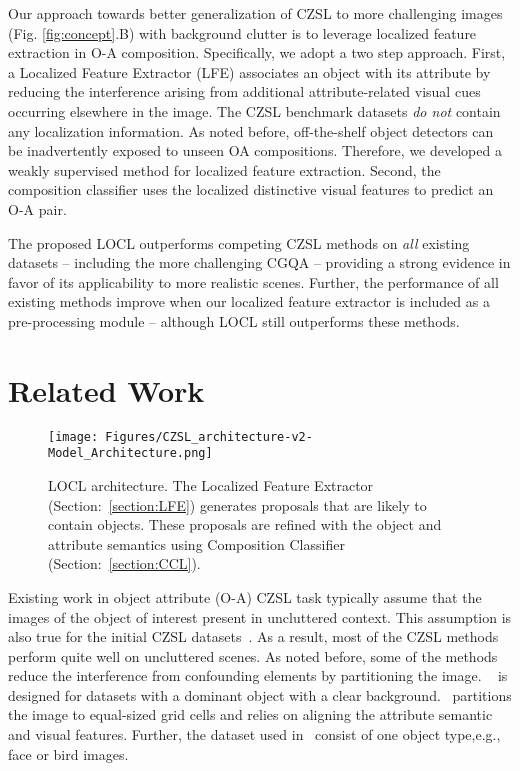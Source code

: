 \documentclass{bmvc2k}
\begin{document}
Our approach towards better generalization of CZSL to more challenging images (Fig. \ref{fig:concept}.B) with background clutter is to leverage localized feature extraction in O-A composition. Specifically, we adopt a two step approach. First, a Localized Feature Extractor (LFE) associates an object with its attribute by reducing the interference arising from additional attribute-related visual cues occurring elsewhere in the image.  The CZSL benchmark datasets \textit{do not} contain any localization information. 
As noted before, off-the-shelf object detectors can be inadvertently exposed \cite{ren2015faster} to unseen OA compositions.
Therefore, we developed a weakly supervised method for localized feature extraction. Second, the composition classifier uses the localized distinctive visual features to predict an O-A pair.

The proposed LOCL outperforms competing CZSL methods on \textit{all} existing datasets -- including the more challenging CGQA -- providing a strong evidence in favor of its applicability to more realistic scenes.
Further, the performance of all existing methods improve when our localized feature extractor is included as a pre-processing module -- although LOCL still outperforms these methods. \vspace{-0.4cm}
\section{Related Work}
\vspace{-0.2cm}
\begin{figure*}[t]
\begin{center}
\texttt{[image: Figures/CZSL\_architecture-v2-Model\_Architecture.png]}
\end{center}
    \vspace{-0.4cm}
   \caption{LOCL architecture. The Localized Feature Extractor (Section:~\ref{section:LFE}) generates proposals that are likely to contain objects. These proposals are refined with the object and attribute semantics using  Composition Classifier (Section:~\ref{section:CCL}). 
   }
\vspace{-0.2cm}
\label{fig:Architecture}
\end{figure*}

Existing work in object attribute (O-A) CZSL task typically assume that the images of the object of interest present in uncluttered context. This assumption is also true for the initial CZSL datasets~\cite{isola2015discovering,yu2017semantic}. As a result, most of the CZSL methods ~\cite{nan2019recognizing,mancini2021open,xu2021relation,ruis2021independent,misra2017red, Wei_2019_ICCV, purushwalkam2019task, Atzmon_casual,nagarajan2018attributes,naeem2021learning} perform quite well on uncluttered scenes. As noted before, some of the methods reduce the  interference from confounding elements by partitioning the image.
~\cite{zhao2019recognizing} is designed for datasets with a dominant object with a clear background.~\cite{huynh2020compositional} partitions the image to equal-sized grid cells and relies on aligning the attribute semantic and visual features. Further, the dataset used in~\cite{zhao2019recognizing,huynh2020compositional} consist of one object type,e.g., face or bird images.  
\end{document}
